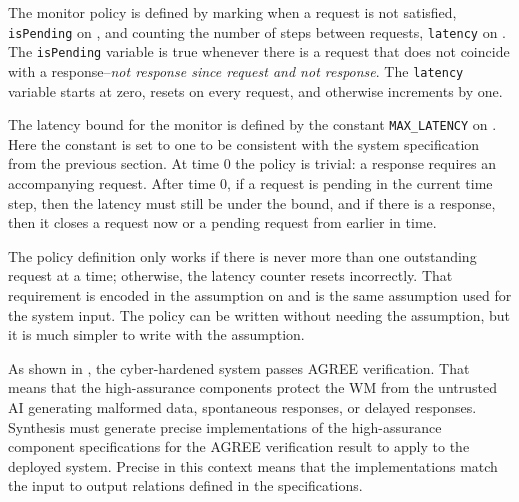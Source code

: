 The monitor policy is defined by marking when a request is not
satisfied, \texttt{isPending} on , and
counting the number of steps between requests, \texttt{latency} on
.  The \texttt{isPending} variable is true
whenever there is a request that does not coincide with a
response--\emph{not response since request and not response}.  The
\texttt{latency} variable starts at zero, resets on every request, and
otherwise increments by one.

The latency bound for the monitor is defined by the constant
\texttt{MAX\_LATENCY} on .  Here the constant
is set to one to be consistent with the system specification from the
previous section.  At time 0 the policy is trivial: a response
requires an accompanying request.  After time 0, if a request is
pending in the current time step, then the latency must still be under
the bound, and if there is a response, then it closes a request now or
a pending request from earlier in time.

The policy definition only works if there is never more than one
outstanding request at a time; otherwise, the latency counter resets
incorrectly.  That requirement is encoded in the assumption on
 and is the same assumption used for the
system input.  The policy can be written without needing the
assumption, but it is much simpler to write with the assumption.

As shown in , the cyber-hardened
system passes AGREE verification.  That means that the high-assurance
components protect the WM from the untrusted AI generating malformed
data, spontaneous responses, or delayed responses.  Synthesis must
generate precise implementations of the high-assurance component
specifications for the AGREE verification result to apply to the
deployed system.  Precise in this context means that the
implementations match the input to output relations defined in the
specifications.
